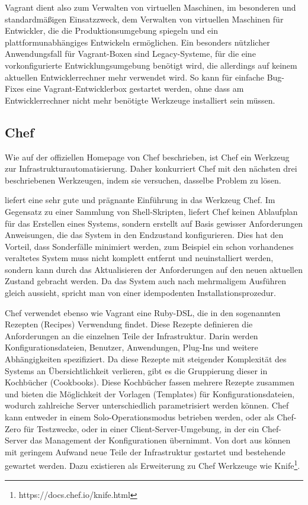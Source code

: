 Vagrant dient also zum Verwalten von virtuellen Maschinen, im besonderen und standardmäßigen Einsatzzweck, dem Verwalten von virtuellen Maschinen für Entwickler, die die Produktionsumgebung spiegeln und ein plattformunabhängiges Entwickeln ermöglichen.
Ein besonders nützlicher Anwendungsfall für Vagrant-Boxen sind Legacy-Systeme, für die eine vorkonfigurierte Entwicklungsumgebung benötigt wird, die allerdings auf keinem aktuellen Entwicklerrechner mehr verwendet wird.
So kann für einfache Bug-Fixes eine Vagrant-Entwicklerbox gestartet werden, ohne dass am Entwicklerrechner nicht mehr benötigte Werkzeuge installiert sein müssen.


\subsection{Chef}
\label{sub:chef}
Wie auf der offiziellen Homepage \autocite{Chef:online} von Chef beschrieben, ist Chef ein Werkzeug zur Infrastrukturautomatisierung. Daher konkurriert Chef mit den nächsten drei beschriebenen Werkzeugen, indem sie versuchen, dasselbe Problem zu lösen.

\autocite[34\psqq]{Wolff201604} liefert eine sehr gute und prägnante Einführung in das Werkzeug Chef.
Im Gegensatz zu einer Sammlung von Shell-Skripten, liefert Chef keinen Ablaufplan für das Erstellen eines Systems, sondern erstellt auf Basis gewisser Anforderungen Anweisungen, die das System in den Endzustand konfigurieren.
Dies hat den Vorteil, dass Sonderfälle minimiert werden, zum Beispiel ein schon vorhandenes veraltetes System muss nicht komplett entfernt und neuinstalliert werden, sondern kann durch das Aktualisieren der Anforderungen auf den neuen aktuellen Zustand gebracht werden.
Da das System auch nach mehrmaligem Ausführen gleich aussieht, spricht man von einer idempodenten Installationsprozedur.

Chef verwendet ebenso wie Vagrant eine Ruby-DSL, die in den sogenannten Rezepten (Recipes) Verwendung findet.
Diese Rezepte definieren die Anforderungen an die einzelnen Teile der Infrastruktur. Darin werden Konfigurationsdateien, Benutzer, Anwendungen, Plug-Ins und weitere Abhängigkeiten spezifiziert.
Da diese Rezepte mit steigender Komplexität des Systems an Übersichtlichkeit verlieren, gibt es die Gruppierung dieser in Kochbücher (Cookbooks).
Diese Kochbücher fassen mehrere Rezepte zusammen und bieten die Möglichkeit der Vorlagen (Templates) für Konfigurationsdateien, wodurch zahlreiche Server unterschiedlich parametrisiert werden können.
Chef kann entweder in einem Solo-Operationsmodus betrieben werden, oder als Chef-Zero für Testzwecke, oder in einer Client-Server-Umgebung, in der ein Chef-Server das Management der Konfigurationen übernimmt.
Von dort aus können mit geringem Aufwand neue Teile der Infrastruktur gestartet und bestehende gewartet werden. Dazu existieren als Erweiterung zu Chef Werkzeuge wie Knife\footnote{https://docs.chef.io/knife.html}.

